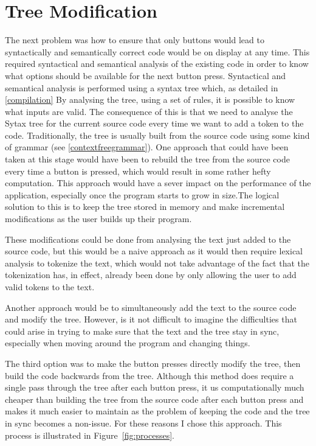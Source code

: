 \documentclass[ %
                    author={Jonathan Rankin},
                supervisor={Dr. David May, Dr. Ian Holyer},
                    degree={MEng},
                     title={CodeTouch},
                  subtitle={A Revolutionary Way To Program Real Code On Touch Screen Devices},
                      type={enterprise},
                      year={2015 } ]{dissertation}
\begin{document}
\section{Tree Modification}
The next problem was how to ensure that only buttons would lead to syntactically and semantically correct code would be on display at any time. This required syntactical and semantical analysis of the existing code in order to know what options should be available for the next button press. Syntactical and semantical analysis is performed using a syntax tree which, as detailed in \ref{compilation} By analysing the tree, using a set of rules, it is possible to know what inputs are valid. The consequence of this is that we need to analyse the Sytax tree for the current source code every time we want to add a token to the code. Traditionally, the tree is usually built from the source code using some kind of grammar (see \ref{contextfreegrammar}). One approach that could have been taken at this stage would have been to rebuild the tree from the source code every time a button is pressed, which would result in some rather hefty computation. This approach would have a sever impact on the performance of the application, especially once the program starts to grow in size.The logical solution to this is to keep the tree stored in memory and make incremental modifications as the user builds up their program.

These modifications could be done from analysing the text just added to the source code, but this would be a naive approach as it would then require lexical analysis to tokenize the text, which would not take advantage of the fact that the tokenization has, in effect, already been done by only allowing the user to add valid tokens to the text. 

Another approach would be to simultaneously add the text to the source code and modify the tree. However, is it not difficult to imagine the difficulties that could arise in trying to make sure that the text and the tree stay in sync, especially when moving around the program and changing things.

The third option was to make the button presses directly modify the tree, then build the code backwards from the tree. Although this method does require a single pass through the tree after each button press, it us computationally much cheaper than building the tree from the source code after each button press and makes it much easier to maintain as the problem of keeping the code and the tree in sync becomes a non-issue. For these reasons I chose this approach. This process is illustrated in Figure~\ref{fig:processes}.
\end{document}
